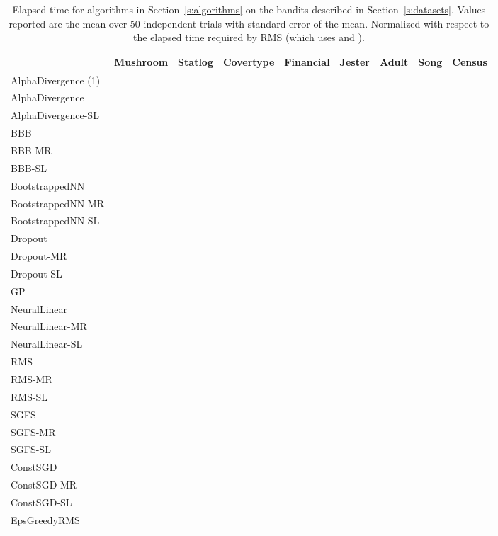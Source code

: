 \documentclass{article} \usepackage{iclr2018_conference,times}
\begin{document}
\begin{landscape}
\begin{table}[ht]
  \caption{Elapsed time for algorithms in Section~\ref{s:algorithms} on the bandits described in Section~\ref{s:datasets}. Values reported are the mean over 50 independent trials with standard error of the mean. Normalized with respect to the elapsed time required by RMS (which uses  and ).}
  \label{tab:nonlinear_time_appendix}
  \centering
  \footnotesize
  \tiny
	\vspace*{\fill}
	\begin{adjustbox}{center}
	\begin{tabular}{lllllllll}
 & Mushroom & Statlog & Covertype & Financial & Jester & Adult & Song & Census \\
\midrule
AlphaDivergence (1) & & & & & & & &  \\
AlphaDivergence & & & & & & & &  \\
AlphaDivergence-SL & & & & & & & &  \\
BBB & & & & & & & &  \\
BBB-MR & & & & & & & &  \\
BBB-SL & & & & & & & &  \\
BootstrappedNN & & & & & & & &  \\
BootstrappedNN-MR & & & & & & & &  \\
BootstrappedNN-SL & & & & & & & &  \\
Dropout & & & & & & & &  \\
Dropout-MR & & & & & & & &  \\
Dropout-SL & & & & & & & &  \\
GP & & & & & & & &  \\
NeuralLinear & & & & & & & &  \\
NeuralLinear-MR & & & & & & & &  \\
NeuralLinear-SL & & & & & & & &  \\
RMS & & & & & & & &  \\
RMS-MR & & & & & & & &  \\
RMS-SL & & & & & & & &  \\
SGFS & & & & & & & &  \\
SGFS-MR & & & & & & & &  \\
SGFS-SL & & & & & & & &  \\
ConstSGD & & & & & & & &  \\
ConstSGD-MR & & & & & & & &  \\
ConstSGD-SL & & & & & & & &  \\
EpsGreedyRMS & & & & & & & &  \\

\end{tabular}
\end{adjustbox}
\end{table}
\end{landscape}
\end{document}
